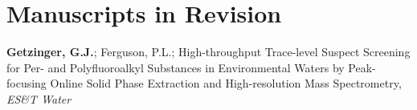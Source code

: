 \documentclass[letterpaper,10pt]{article}
\begin{document}
\section{Manuscripts in Revision}
\begin{etaremune}
\item {\bfseries Getzinger, G.J.}; Ferguson, P.L.;  High-throughput Trace-level Suspect Screening for Per- and Polyfluoroalkyl Substances in Environmental Waters by Peak-focusing Online Solid Phase Extraction and High-resolution Mass Spectrometry, \emph{ES\&T Water} 
\end{etaremune}
%
\end{document}

